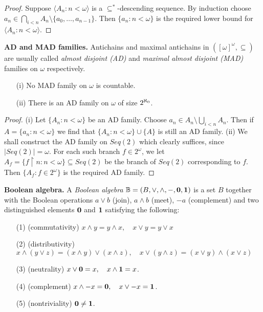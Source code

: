 \begin{proof}
Suppose $\langle A_n:n<\omega\rangle$ is a $\subseteq^*$-descending sequence.
By induction choose $a_n\in \bigcap_{i<n} A_n\setminus\{a_0,\ldots,a_{n-1}\}$.
Then $\{a_n:n<\omega\}$ is the required lower bound for $\langle A_n:n<\omega\rangle$.
\end{proof}

\begin{definition}\label{mad}
{\bf AD and MAD families.} Antichains and maximal antichains in
$([\omega]^\omega,\subseteq)$ are usually called \emph{almost disjoint (AD)} and
\emph{maximal almost disjoint (MAD)} families on $\omega$ respectively.
\end{definition}

\begin{fact}
\begin{itemize}
\item[(i)]  No MAD family on $\omega$ is countable.
\item[(ii)]  There is an AD family on $\omega$ of size ${2^{\aleph_0}}$.
\end{itemize}
\end{fact}


\begin{proof}
(i) Let $\{A_n:n<\omega\}$ be an AD family. Choose $a_n\in A_n\setminus \bigcup_{i<n} A_n$. Then if $A=\{a_n:n<\omega\}$ we find that $
\{A_n:n<\omega\}\cup\{A\}$ is still an AD family. (ii) We shall construct the AD family on $Seq(2)$ which clearly suffices, since $|Seq(2)|=\omega$.
For each such branch $f\in 2^\omega$, we let $A_f=\{f\upharpoonright n:n<\omega\}\subseteq Seq(2)$ be the branch of $Seq(2)$ corresponding to $f$. Then
$\{A_f:f\in 2^\omega\}$ is the required AD family.
\end{proof}



\begin{definition}
{\bf Boolean algebra.}
A \emph{Boolean algebra} ${\mathbb B}=(B,\vee,\wedge,-,\hbox{\bf 0},\hbox{\bf 1})$ is a set
$B$ together with the Boolean operations $a\vee b$ (join), $a\wedge b$ (meet), $-a$ (complement)
and two distinguished elements $\hbox{\bf 0}$ and $\hbox{\bf 1}$ satisfying the following:
\begin{itemize}
 \item[(1)]{(commutativity)} $x\wedge y=y\wedge x,\quad x\vee y=y\vee x$
 \item[(2)]{(distributivity)}
	$x\wedge(y\vee z)=(x\wedge y)\vee(x\wedge z),\quad x\vee(y\wedge z)=(x\vee y)\wedge(x\vee z)$
 \item[(3)]{(neutrality)} $x\vee\hbox{\bf 0}=x,\quad x\wedge\hbox{\bf 1}=x$.
 \item[(4)]{(complement)} $x\wedge-x=\hbox{\bf 0},\quad x\vee-x=\hbox{\bf 1}$.
 \item[(5)]{(nontriviality)} $\hbox{\bf 0}\neq\hbox{\bf 1}$.
\end{itemize}
\end{definition}


